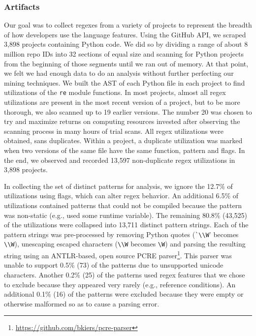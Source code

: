 \subsubsection{Artifacts}
Our goal was to collect regexes from a variety of projects to represent the breadth of how developers use the language features.
Using the GitHub API, we scraped 3,898 projects containing Python code.
We did so  by dividing a range of about 8 million repo IDs
into 32 sections of equal size and scanning  for Python projects from the beginning of those
segments until we ran out of memory. At that point, we felt we had enough data
to do an analysis without further perfecting our mining techniques. We built
the AST of each Python file in each project to find utilizations of the {\tt re} module
functions. In most projects, almost all regex utilizations are present in the
most recent version of a project, but to be more thorough, we also scanned up
to 19 earlier versions. The number 20 was chosen to try and maximize returns on
computing resources invested after observing the scanning process in many hours
of trial scans.
All regex utilizations were obtained, sans duplicates. Within a project, a duplicate utilization was marked when two versions of the same file have the same function, pattern and flags.  In the end, we observed and recorded 13,597 non-duplicate regex utilizations in 3,898 projects.

In collecting the set of distinct patterns for analysis,  we ignore the 12.7\%  of utilizations using flags, which can alter regex behavior.  An additional 6.5\% of utilizations contained patterns that could not be compiled because the pattern was non-static (e.g., used some runtime variable).
The remaining 80.8\% (43,525) of the utilizations were collapsed into 13,711 distinct pattern strings.  Each of the pattern strings was pre-processed by removing Python quotes (\verb!`\\W!' becomes \verb!\\W!), unescaping escaped characters (\verb!\\W! becomes \verb!\W!) and parsing the resulting  string using an ANTLR-based, open source PCRE parser\footnote{\url{https://github.com/bkiers/pcre-parser}}.
This parser was unable to support 0.5\% (73) of the patterns due to unsupported unicode characters.  Another 0.2\% (25) of the patterns used regex features that we  chose to exclude because they appeared very rarely (e.g., reference conditions).  An additional 0.1\% (16) of the patterns were excluded because they were empty or otherwise malformed so as to cause a parsing error.

